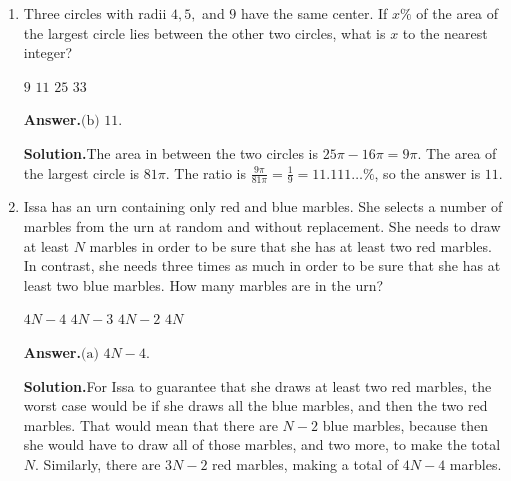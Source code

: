 \documentclass[11pt,paper=letter]{scrartcl}
\newcommand{\ans}{{\sffamily \bfseries Answer.}\;}
\newcommand{\ansb}[2]{\ans\(\boxed{\text{(#1) #2}}\).}
\newcommand{\sol}{{\sffamily \bfseries Solution.}\;}
\newenvironment{rem}%
{\noindent \ignorespaces \small \sffamily \sansmath {\bfseries Remark.}}%
{\ignorespacesafterend}
\begin{document}
\begin{enumerate}[left=0pt]
\sol From the \href{https://en.wikipedia.org/wiki/Triangle_inequality#Mathematical_expression_of_the_constraint_on_the_sides_of_a_triangle}{triangle inequality}, we get $5 - 3 < x < 5 + 3$, or $2 < x < 8$, and similarly $2 < y < 10$. Either we want to make $x$ as large as possible and $y$ as small as possible, or vice-versa. We can check that the maximum is when $x = 3$ and $y = 9$, with a difference of $6$.

\begin{rem}
To see why the third side has to have length between the difference and the sum of the two other sides, consider this visually. The two other sides are joined by a vertex. When the angle between them approaches $0\dg$, the third side approaches the difference of the two sides. When the angle approaches $180\dg$, the third side approaches their sum.
\end{rem}

\item Three circles with radii $4, 5,$ and $9$ have the same center. If $x\%$ of the area of the largest circle lies between the other two circles, what is $x$ to the nearest integer?

\fourch
{$9$}
{$11$}
{$25$}
{$33$}

\ansb{b}{$11$}

\sol The area in between the two circles is $25\pi - 16\pi = 9\pi$. The area of the largest circle is $81\pi$. The ratio is $\frac{9\pi}{81\pi} = \frac{1}{9} = 11.111\ldots \%$, so the answer is $11$.

\item Issa has an urn containing only red and blue marbles. She selects a number of marbles from the urn at random and without replacement. She needs to draw at least $N$ marbles in order to be sure that she has at least two red marbles. In contrast, she needs three times as much in order to be sure that she has at least two blue marbles. How many marbles are in the urn?

\fourch
{$4N - 4$}
{$4N - 3$}
{$4N - 2$}
{$4N$}

\ansb{a}{$4N - 4$}

\sol For Issa to guarantee that she draws at least two red marbles, the worst case would be if she draws all the blue marbles, and then the two red marbles. That would mean that there are $N - 2$ blue marbles, because then she would have to draw all of those marbles, and two more, to make the total $N$. Similarly, there are $3N - 2$ red marbles, making a total of $4N - 4$ marbles.


\end{enumerate}
\end{document}
